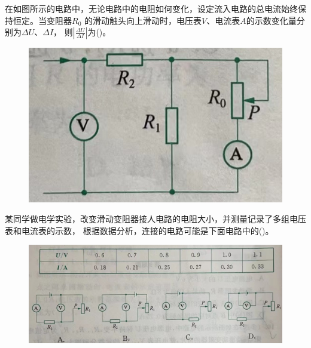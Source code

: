 \documentclass[a4paper,cs4size]{BHCexam}
\begin{document}
\begin{groups}
\begin{questions}[]
        \question[5] 在如图所示的电路中，无论电路中的电阻如何变化，设定流入电路的总电流始终保持恒定。当变阻器$R_0$
        的滑动触头向上滑动时，电压表$V$、电流表$A$的示数变化量分别为$\Delta U$、$\Delta I$，
        则$\left| \frac{\Delta U}{\Delta I} \right|$为(\quad\quad\quad)。
        \begin{figure}[htb]
            \flushright
            \includegraphics [scale=0.4,trim=0 0 0 0]{./image/physics_circuit3_8.png}
            \label{fig:fig_circuit3_8}
        \end{figure}
        \vspace{2.5cm}

        \question[5] 某同学做电学实验，改变滑动变阻器接人电路的电阻大小，并测量记录了多组电压表和电流表的示数，
        根据数据分析，连接的电路可能是下面电路中的(\quad\quad\quad)。
        \begin{figure}[htb]
            \includegraphics [scale=0.5,trim=0 0 0 0]{./image/physics_circuit3_9.png}
            \label{fig:fig_circuit3_9}
        \end{figure}
        \vspace{2.5cm}


\end{questions}
\end{groups}
\end{document}
